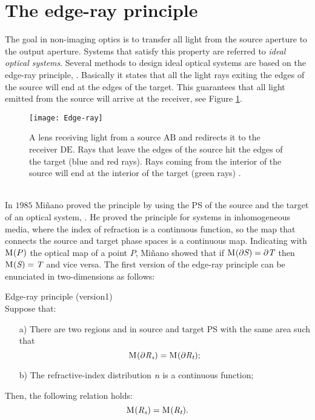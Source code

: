 \section{The edge-ray principle}
The goal in non-imaging optics is to transfer all light from the source aperture to the output aperture. Systems that satisfy this property are referred to \textit{ideal optical systems}.
Several methods to design ideal optical systems are based on the edge-ray principle, \cite{welford1978problem, benitez1997design}. 
Basically it states that all the light rays exiting the edges of the source will end at the edges of the target. 
This guarantees that all light emitted from the source will arrive at the receiver, see Figure \ref{fig:edge}. 
 \begin{figure}[h]
  \begin{center}
  \texttt{[image: Edge-ray]}
  \end{center}
  \caption{A lens receiving light from a source $\textrm{A}\textrm{B}$ and redirects it to the receiver $\textrm{D}\textrm{E}$. 
Rays that leave the edges of the source hit the edges of the target (blue and red rays). Rays coming from the interior of the source will end at the interior of the target (green rays) \cite{wiki2}.}
  \label{fig:edge}
\end{figure}
\\ \indent
In $1985$ Mi{\~n}ano proved the principle by using the PS of the source and the target of an optical system, \cite{minano1985two, minano1986design}. He proved the principle for systems in inhomogeneous media, where the index of refraction is a continuous function, so the map that connects the source and target phase spaces is a continuous map.
Indicating with $\mathrm{M}_{\textit{}}(P)$ the optical map of a point $P$, Mi{\~n}ano showed that if $\mathrm{M}_{\textit{}}(\partial\mbox{$\emph{S}_{\textit{}}$})=\partial\mbox{$\emph{T}_{\textit{}}$}$ then 
$\mathrm{M}_{\textit{}}(\mbox{$\emph{S}_{\textit{}}$})=\mbox{$\emph{T}_{\textit{}}$}$ and vice versa. 
The first version of the edge-ray principle \cite{minano1986design} can be enunciated in two-dimensions as follows:
\begin{lemma}{Edge-ray principle (version1)}\\ 
Suppose that:
\begin{itemize}
\item[a)] There are two regions  and  in source and target PS with the same area such that 
$$\mathrm{M}_{\textit{}}(\partial\mbox{$\emph{R}_{\textit{\textrm{s}}}$}) = \mathrm{M}_{\textit{}}(\partial\mbox{$\emph{R}_{\textit{\textrm{t}}}$});$$ 
\item[b)] The refractive-index distribution $\textit{n}$ is a continuous function; 
\end{itemize}
Then, the following relation holds: $$\mathrm{M}_{\textit{}}(\mbox{$\emph{R}_{\textit{\textrm{s}}}$}) = \mathrm{M}_{\textit{}}(\mbox{$\emph{R}_{\textit{\textrm{t}}}$}).$$
\end{lemma} 
